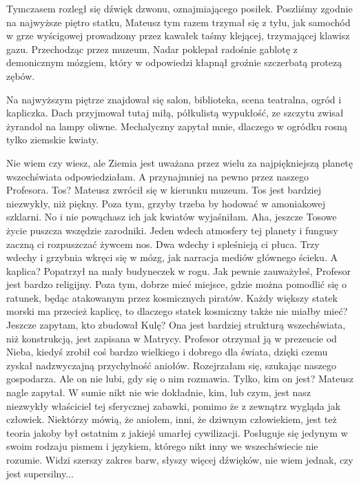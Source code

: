 Tymczasem rozległ się dźwięk dzwonu, oznajmiającego posiłek.
Poszliśmy zgodnie na najwyższe piętro statku, Mateusz tym razem trzymał się z tyłu, jak samochód w grze wyścigowej prowadzony przez kawałek taśmy klejącej, trzymającej klawisz gazu.
Przechodząc przez muzeum, Nadar poklepał radośnie gablotę z demonicznym mózgiem, który w odpowiedzi kłapnął groźnie szczerbatą protezą zębów.

Na najwyższym piętrze znajdował się salon, biblioteka, scena teatralna, ogród i kapliczka.
Dach przyjmował tutaj miłą, półkulistą wypukłość, ze szczytu zwisał żyrandol na lampy oliwne.
Mechalyczny zapytał mnie, dlaczego w ogródku rosną tylko ziemskie kwiaty.

\begin{dialogue}
\ds{} Nie wiem czy wiesz, ale Ziemia jest uważana przez wielu za najpiękniejszą planetę wszechświata \dm{} odpowiedziałam. \dm{}
A przynajmniej na pewno przez naszego Profesora.
\ds{} Tos? \dm{} Mateusz zwrócił się w kierunku muzeum.
\ds{} Tos jest bardziej niezwykły, niż piękny. Poza tym, grzyby trzeba by hodować w amoniakowej szklarni.
No i nie powąchasz ich jak kwiatów \dm{} wyjaśniłam. \dm{} Aha, jeszcze Tosowe życie puszcza wszędzie zarodniki. 
Jeden wdech atmosfery tej planety i fungusy zaczną ci rozpuszczać żywcem nos. Dwa wdechy i spleśnieją ci płuca. Trzy wdechy i grzybnia wkręci się w mózg, jak narracja mediów głównego ścieku.
\ds{} A kaplica? \dm{} Popatrzył na mały budyneczek w rogu.
\ds{} Jak pewnie zauważyłeś, Profesor jest bardzo religijny. Poza tym, dobrze mieć miejsce, gdzie można pomodlić się o ratunek, będąc atakowanym przez kosmicznych piratów. 
Każdy większy statek morski ma przecież kaplicę, to dlaczego statek kosmiczny także nie miałby mieć? 
\ds{} Jeszcze zapytam, kto zbudował Kulę?
\ds{} Ona jest bardziej strukturą wszechświata, niż konstrukcją, jest zapisana w Matrycy. 
Profesor otrzymał ją w prezencie od Nieba, kiedyś zrobił coś bardzo wielkiego i dobrego dla świata, dzięki czemu zyskał nadzwyczajną przychylność aniołów. \dm{}
Rozejrzałam się, szukając naszego gospodarza. \dm{}
Ale on nie lubi, gdy się o nim rozmawia.
\ds{} Tylko, kim on jest? \dm{} Mateusz nagle zapytał.
\ds{} W sumie nikt nie wie dokładnie, kim, lub czym, jest nasz niezwykły właściciel tej sferycznej zabawki, pomimo że z zewnątrz wygląda jak człowiek. 
Niektórzy mówią, że aniołem, inni, że dziwnym człowiekiem,
jest też teoria jakoby był ostatnim z jakiejś umarłej cywilizacji. 
Posługuje się jedynym w swoim rodzaju pismem i językiem, którego nikt inny we wszechświecie nie rozumie.
Widzi szerszy zakres barw, słyszy więcej dźwięków, nie wiem jednak, czy jest supersilny...
\end{dialogue}

